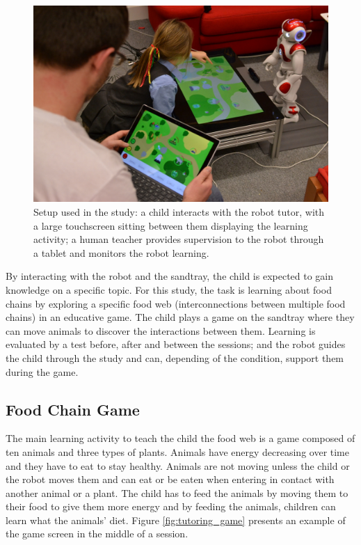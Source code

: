 \begin{figure}[ht]
	\centering
	\includegraphics[width=.5\textwidth]{setup.jpg}
	\caption{Setup used in the study: a child interacts with the robot tutor, with a large touchscreen sitting between them displaying the learning activity; a human teacher provides supervision to the robot through a tablet and monitors the robot learning.}
	\label{fig:tutoring_setup}
\end{figure}

By interacting with the robot and the sandtray, the child is expected to gain knowledge on a specific topic. For this study, the task is learning about food chains by exploring a specific food web (interconnections between multiple food chains) in an educative game. The child plays a game on the sandtray where they can move animals to discover the interactions between them. Learning is evaluated by a test before, after and between the sessions; and the robot guides the child through the study and can, depending of the condition, support them during the game.

\subsection{Food Chain Game}

The main learning activity to teach the child the food web is a game composed of ten animals and three types of plants. Animals have energy decreasing over time and they have to eat to stay healthy. Animals are not moving unless the child or the robot moves them and can eat or be eaten when entering in contact with another animal or a plant. The child has to feed the animals by moving them to their food to give them more energy and by feeding the animals, children can learn what the animals' diet. Figure \ref{fig:tutoring_game} presents an example of the game screen in the middle of a session.

